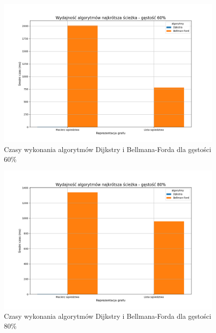 \documentclass{article}
\begin{document}
\begin{figure}[H]
    \centering
    \includegraphics[scale=0.5]{../Python/charts_type2/Typ2_SHORTEST_PATH_gestosc60_wykres.png}
    \caption{Czasy wykonania algorytmów Dijkstry i Bellmana-Forda dla gęstości 60\%}
\end{figure}

\begin{figure}[H]
    \centering
    \includegraphics[scale=0.5]{../Python/charts_type2/Typ2_SHORTEST_PATH_gestosc80_wykres.png}
    \caption{Czasy wykonania algorytmów Dijkstry i Bellmana-Forda dla gęstości 80\%}
\end{figure}
\end{document}

